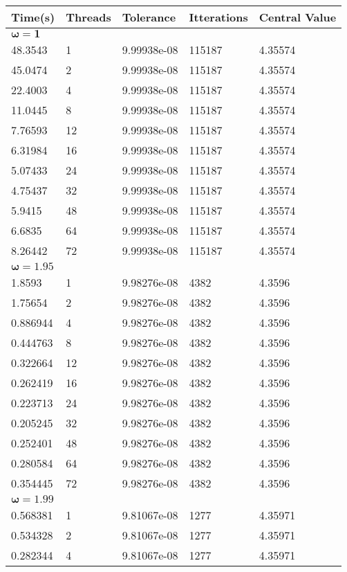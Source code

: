 \documentclass[11pt]{scrartcl} %
\begin{document}
\begin{table}[h]
\begin{tabular}{lllll}
Time(s) & Threads & Tolerance & Itterations & Central Value\\
\hline
\hline
$\mathbf{\omega=1}$\\
\hline
48.3543 & 1 & 9.99938e-08 & 115187 & 4.35574 \\
45.0474 & 2 & 9.99938e-08 & 115187 & 4.35574 \\
22.4003 & 4 & 9.99938e-08 & 115187 & 4.35574 \\
11.0445 & 8 & 9.99938e-08 & 115187 & 4.35574 \\
7.76593 & 12 & 9.99938e-08 & 115187 & 4.35574 \\
6.31984 & 16 & 9.99938e-08 & 115187 & 4.35574 \\
5.07433 & 24 & 9.99938e-08 & 115187 & 4.35574 \\
4.75437 & 32 & 9.99938e-08 & 115187 & 4.35574 \\
5.9415 & 48 & 9.99938e-08 & 115187 & 4.35574 \\
6.6835 & 64 & 9.99938e-08 & 115187 & 4.35574 \\
8.26442 & 72 & 9.99938e-08 & 115187 & 4.35574\\
$\mathbf{\omega=1.95}$\\
\hline
1.8593 & 1 & 9.98276e-08 & 4382 & 4.3596 \\
1.75654 & 2 & 9.98276e-08 & 4382 & 4.3596 \\
0.886944 & 4 & 9.98276e-08 & 4382 & 4.3596 \\
0.444763 & 8 & 9.98276e-08 & 4382 & 4.3596 \\
0.322664 & 12 & 9.98276e-08 & 4382 & 4.3596 \\
0.262419 & 16 & 9.98276e-08 & 4382 & 4.3596 \\
0.223713 & 24 & 9.98276e-08 & 4382 & 4.3596 \\
0.205245 & 32 & 9.98276e-08 & 4382 & 4.3596 \\
0.252401 & 48 & 9.98276e-08 & 4382 & 4.3596 \\
0.280584 & 64 & 9.98276e-08 & 4382 & 4.3596 \\
0.354445 & 72 & 9.98276e-08 & 4382 & 4.3596 \\
$\mathbf{\omega=1.99}$\\
\hline
0.568381 & 1 & 9.81067e-08 & 1277 & 4.35971 \\
0.534328 & 2 & 9.81067e-08 & 1277 & 4.35971 \\
0.282344 & 4 & 9.81067e-08 & 1277 & 4.35971 \\

\end{tabular}
\end{table}
\end{document}

